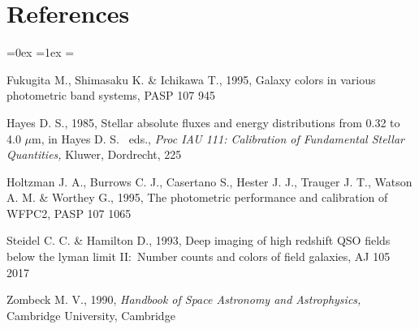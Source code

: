 \section*{References}
\begin{list}{}{
  \item \rightmargin=0in
  \leftmargin=0.25in
  \topsep=0ex
  \partopsep=0pt
  \itemsep=1ex
  \parsep=0pt
  \leftmargin
  \listparindent=\leftmargin
}
\item
Fukugita M., Shimasaku K. \& Ichikawa T., 1995, Galaxy colors in
various photometric band systems, PASP 107 945
\item
Hayes D. S., 1985, Stellar absolute fluxes and energy distributions
from 0.32 to 4.0 $\mu$m, in Hayes D. S. \etal\, eds., {\em Proc IAU
111: Calibration of Fundamental Stellar Quantities,} Kluwer,
Dordrecht, 225
\item
Holtzman J. A., Burrows C. J., Casertano S., Hester J. J., Trauger J.
T., Watson A. M. \& Worthey G., 1995, The photometric performance and
calibration of WFPC2, PASP 107 1065
\item
Steidel C. C. \& Hamilton D., 1993, Deep imaging of high redshift QSO
fields below the lyman limit II:\ Number counts and colors of field
galaxies, AJ 105 2017
\item
Zombeck M. V., 1990, {\it Handbook of Space Astronomy and
Astrophysics,\/} Cambridge University, Cambridge
\end{list}


